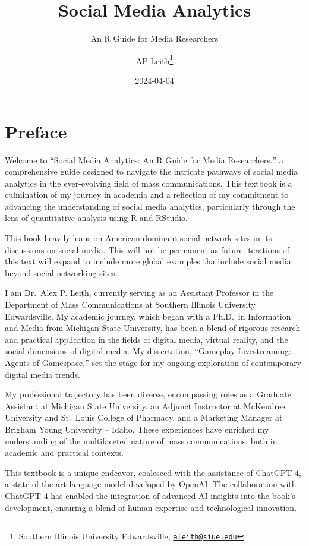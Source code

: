 \documentclass[
]{book}
\title{Social Media Analytics}
\subtitle{An R Guide for Media Researchers}
\author{AP Leith\footnote{Southern Illinois University Edwardsville, \href{mailto:aleith@siue.edu}{\nolinkurl{aleith@siue.edu}}}}
\date{2024-04-04}
\begin{document}
\maketitle

{
\setcounter{tocdepth}{1}
\tableofcontents
}
\hypertarget{preface}{%
\chapter*{Preface}\label{preface}}

Welcome to ``Social Media Analytics: An R Guide for Media Researchers,'' a comprehensive guide designed to navigate the intricate pathways of social media analytics in the ever-evolving field of mass communications. This textbook is a culmination of my journey in academia and a reflection of my commitment to advancing the understanding of social media analytics, particularly through the lens of quantitative analysis using R and RStudio.

This book heavily leans on American-dominant social network sites in its discussions on social media. This will not be permanent as future iterations of this text will expand to include more global examples tha include social media beyond social networking sites.

I am Dr.~Alex P. Leith, currently serving as an Assistant Professor in the Department of Mass Communications at Southern Illinois University Edwardsville. My academic journey, which began with a Ph.D.~in Information and Media from Michigan State University, has been a blend of rigorous research and practical application in the fields of digital media, virtual reality, and the social dimensions of digital media. My dissertation, ``Gameplay Livestreaming: Agents of Gamespace,'' set the stage for my ongoing exploration of contemporary digital media trends.

My professional trajectory has been diverse, encompassing roles as a Graduate Assistant at Michigan State University, an Adjunct Instructor at McKendree University and St.~Louis College of Pharmacy, and a Marketing Manager at Brigham Young University -- Idaho. These experiences have enriched my understanding of the multifaceted nature of mass communications, both in academic and practical contexts.

This textbook is a unique endeavor, coalesced with the assistance of ChatGPT 4, a state-of-the-art language model developed by OpenAI. The collaboration with ChatGPT 4 has enabled the integration of advanced AI insights into the book's development, ensuring a blend of human expertise and technological innovation.
\end{document}
